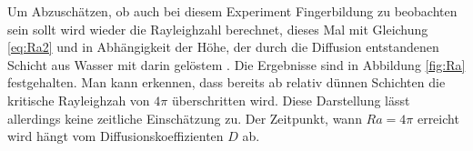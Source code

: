 Um Abzuschätzen, ob auch bei diesem Experiment Fingerbildung zu beobachten sein sollt wird wieder die Rayleighzahl berechnet, dieses Mal mit Gleichung \ref{eq:Ra2} und in Abhängigkeit der Höhe, der durch die Diffusion entstandenen Schicht aus Wasser mit darin gelöstem \COT. Die Ergebnisse sind in Abbildung \ref{fig:Ra} festgehalten. Man kann erkennen, dass bereits ab relativ dünnen Schichten die kritische Rayleighzah von $4\pi$ überschritten wird. Diese Darstellung lässt allerdings keine zeitliche Einschätzung zu. Der Zeitpunkt, wann $Ra=4\pi$ erreicht wird hängt vom Diffusionskoeffizienten $D$ ab.